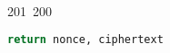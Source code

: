 201~200~\documentclass{article}
\begin{document}
\begin{lstlisting}[language=Python, caption=Encrypting a Message with ChaCha20-Poly1305]
	                                                                                                                                                                                                                                                                                                	                                                                                                                                        	    	                                                                                                	                                                                                                                                                                                                                                                                                                                                	                                                                        	                                                                        	                                                                                                                                        	                                                                                                                                                                                                                        	                                                                                                                            	                                                                	                                                                                                                                            return nonce, ciphertext

\end{lstlisting}
\end{document}

